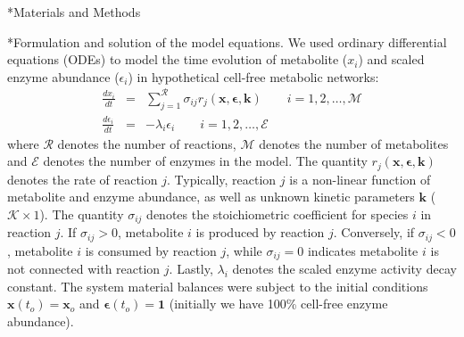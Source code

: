 \documentclass[12pt]{article}
\makeatletter
\renewcommand\subsection{\@startsection
	{subsection}{2}{0mm}
	{-0.05in}
	{-0.5\baselineskip}
	{\normalfont\normalsize\bfseries}}
\renewcommand\section{\@startsection
	{subsection}{2}{0mm}
	{-0.2in}
	{0.05\baselineskip}
	{\normalfont\large\bfseries}}
\makeatother
\begin{document}
\clearpage

\section*{Materials and Methods}

\subsection*{Formulation and solution of the model equations.}
We used ordinary differential equations (ODEs) to model the time evolution of metabolite ($x_{i}$) and scaled enzyme abundance ($\epsilon_{i}$) in hypothetical cell-free metabolic networks:
\begin{eqnarray}
	\frac{dx_{i}}{dt} & = & \sum_{j=1}^{\mathcal{R}}\sigma_{ij}r_{j}\left(\mathbf{x},\mathbf{\epsilon},\mathbf{k}\right)\qquad{i=1,2,\hdots,\mathcal{M}}\\
	\frac{d\epsilon_{i}}{dt} & = & -\lambda_{i}\epsilon_{i}\qquad{i=1,2,\hdots,\mathcal{E}}
\end{eqnarray}where $\mathcal{R}$ denotes the number of reactions, $\mathcal{M}$ denotes the number of metabolites and $\mathcal{E}$ denotes the number of enzymes in the model.
The quantity $r_{j}\left(\mathbf{x},\mathbf{\epsilon},\mathbf{k}\right)$ denotes the rate of reaction $j$.
Typically, reaction $j$ is a non-linear function of metabolite and enzyme abundance, as well as unknown kinetic parameters $\mathbf{k}$ ($\mathcal{K}\times{1}$).
The quantity $\sigma_{ij}$ denotes the stoichiometric coefficient for species $i$ in reaction $j$.
If $\sigma_{ij}>0$, metabolite $i$ is produced by reaction $j$.
Conversely, if $\sigma_{ij}<0$, metabolite $i$ is consumed by reaction $j$, while $\sigma_{ij}=0$ indicates metabolite $i$ is not connected with reaction $j$.
Lastly, $\lambda_{i}$ denotes the scaled enzyme activity decay constant.
The system material balances were subject to the initial conditions $\mathbf{x}\left(t_{o}\right)=\mathbf{x}_{o}$ and $\mathbf{\epsilon}\left(t_{o}\right)=\mathbf{1}$ (initially we have 100\% cell-free enzyme abundance).
\end{document}
